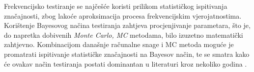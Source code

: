 Frekvencijsko testiranje se najčešće koristi prilikom statističkog ispitivanja značajnosti, zbog lakoće aproksimacija procesa frekvencijskim vjerojatnostima. Korištenje Bayesovog načina testiranja zahtjeva procjenjivanje parametara, što je, do napretka dobivenih \textit{Monte Carlo, MC} \citep{hammersley1965monte} metodama, bilo izuzetno matematički zahtjevno. Kombinacijom današnje računalne snage i MC metoda moguće je promatrati ispitivanje statističke značajnosti na Bayesov način, te se smatra kako će ovakav način testiranja postati dominantan u literaturi kroz nekoliko godina \citep{gelman2012philosophy}. 